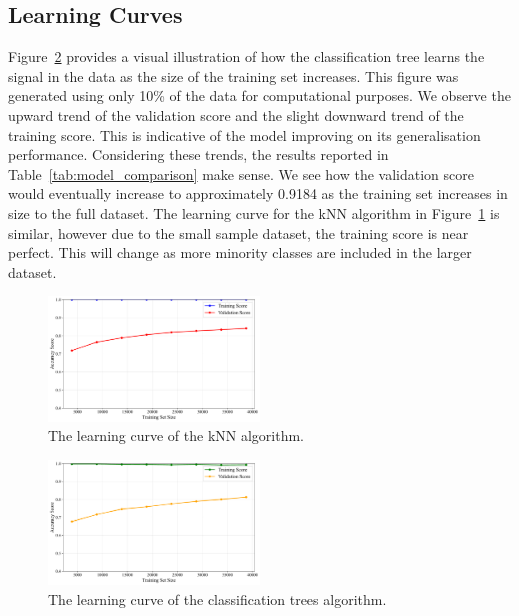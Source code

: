 \documentclass[10pt, conference]{IEEEtran}
\begin{document}
\subsection{Learning Curves}
Figure~\ref{fig:dt-learning} provides a visual illustration of how the classification tree learns the signal in the data as the size of the training set increases. This figure was generated using only 10\% of the data for computational purposes. We observe the upward trend of the validation score and the slight downward trend of the training score. This is indicative of the model improving on its generalisation performance. Considering these trends, the results reported in Table~\ref{tab:model_comparison} make sense. We see how the validation score would eventually increase to approximately 0.9184 as the training set increases in size to the full dataset. The learning curve for the kNN algorithm in Figure~\ref{fig:knn-learning} is similar, however due to the small sample dataset, the training score is near perfect. This will change as more minority classes are included in the larger dataset.

\begin{figure}[htbp]
	\centering
	\includegraphics[width=0.5\textwidth]{../plots/knn_learning_curve.pdf}
	\caption{The learning curve of the kNN algorithm.}
	\label{fig:knn-learning}
\end{figure}

\begin{figure}[htbp]
	\centering
	\includegraphics[width=0.5\textwidth]{../plots/dt_learning_curve.pdf}
	\caption{The learning curve of the classification trees algorithm.}
	\label{fig:dt-learning}
\end{figure}
\end{document}
